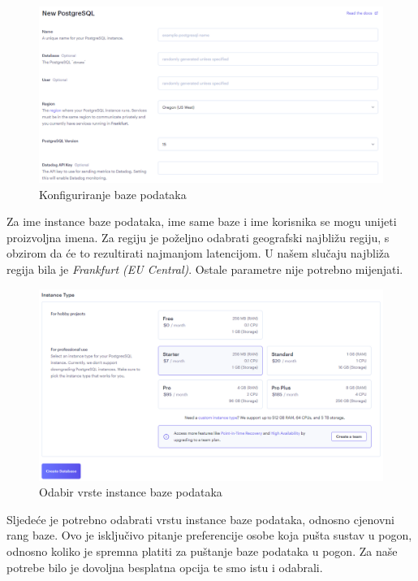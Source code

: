 			\begin{figure}[H]
				\includegraphics[width=\textwidth]{slike/upute/konfiguriranjeBaze.png} %
				\caption{Konfiguriranje baze podataka}
				\label{fig:konfiguriranjeBaze} %
			\end{figure}
			
			Za ime instance baze podataka, ime same baze i ime korisnika se mogu unijeti proizvoljna imena. Za regiju je poželjno odabrati geografski najbližu regiju, s obzirom da će to rezultirati najmanjom latencijom. U našem slučaju najbliža regija bila je \textit{Frankfurt (EU Central)}. Ostale parametre nije potrebno mijenjati.
			
			\begin{figure}[H]
				\includegraphics[width=\textwidth]{slike/upute/bazaPlacanje.png} %
				\caption{Odabir vrste instance baze podataka}
				\label{fig:bazaPlacanje} %
			\end{figure}
			
			Sljedeće je potrebno odabrati vrstu instance baze podataka, odnosno cjenovni rang baze. Ovo je isključivo pitanje preferencije osobe koja pušta sustav u pogon, odnosno koliko je spremna platiti za puštanje baze podataka u pogon. Za naše potrebe bilo je dovoljna besplatna opcija te smo istu i odabrali.
			
